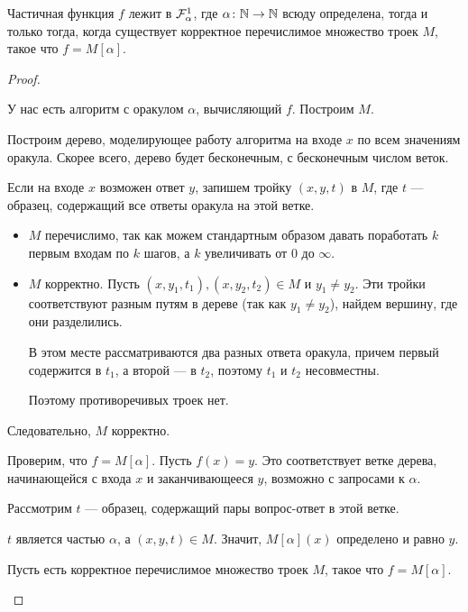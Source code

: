 \begin{thm}\label{thm:malp}
	Частичная функция $ f $ лежит в $\mathcal{F}^{1}_{ \alpha }$, где $ \alpha \colon \mathbb{N} \to  \mathbb{N}$ всюду определена, тогда и только тогда, когда существует корректное перечислимое множество троек $ M$, такое что  $ f = M[ \alpha ]$. 
\end{thm}
\begin{proof}
~\begin{description}
	\item[] У нас есть алгоритм с оракулом $  \alpha $, вычисляющий $ f$. Построим $ M$.

		   Построим  дерево, моделирующее работу алгоритма на входе $ x$ по всем значениям оракула. Скорее всего, дерево будет бесконечным, с бесконечным числом веток.

		   Если на входе $ x$ возможен ответ $ y$, запишем тройку  $ (x, y, t)$ в  $ M$, где  $ t$ --- образец, содержащий все  ответы оракула на этой ветке.
		   \begin{itemize}
			   \item $ M$ перечислимо, так как можем стандартным образом давать поработать $ k$ первым входам по $ k$ шагов, а $ k$ увеличивать от $ 0$ до  $  \infty$.
			   \item $ M$ корректно. Пусть  $ (x, y_1, t_1), (x, y_2, t_2) \in M$ и $  y_1 \ne y_2$. Эти тройки соответствуют разным путям в дереве (так как $  y_1 \ne y_2$), найдем вершину, где они разделились. 
			   
			   В этом месте рассматриваются два разных ответа оракула, причем первый содержится в $  t_1$, а второй --- в $  t_2$, поэтому $  t_1$ и $  t_2$ несовместны.

				   Поэтому противоречивых троек нет.
		   \end{itemize}
		   Следовательно, $ M$ корректно.
	   \item Проверим, что $ f = M[ \alpha ]$. Пусть $ f(x) = y$. Это соответствует ветке дерева, начинающейся с входа $ x$ и заканчивающееся   $ y$, возможно с запросами к $  \alpha $.

		   Рассмотрим $ t$ --- образец, содержащий пары вопрос-ответ в этой ветке. 
		   
		   $ t$ является частью  $ \alpha $, а $ (x, y, t) \in M$.
		   Значит, $ M[ \alpha ](x) $ определено и равно $ y$.
	   \item[\boxed{ 2 \Longrightarrow 1}] 
		   Пусть есть корректное перечислимое множество троек $ M$, такое  что $ f = M[ \alpha ]$.


\end{description}
\end{proof}

